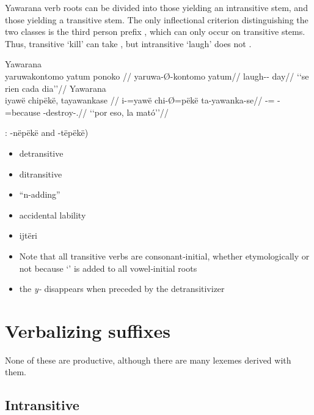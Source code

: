 \documentclass{memoir}
\begin{document}
Yawarana verb roots can be divided into those yielding an intransitive
stem, and those yielding a transitive stem. The only inflectional
criterion distinguishing the two classes is the third person prefix
, which can only occur on transitive stems. Thus, transitive
 `kill' can take  , but
intransitive  `laugh' does not .

\pex\label{}    \a Yawarana\\
    \label{convrisamaj-42}        \begingl
        \glpreamble yaruwakontomo yatum ponoko //
        \gla yaruwa-Ø-kontomo yatum//
        \glb laugh-- day//
            \glft ‘‘se rien cada dia’’//  
        \endgl 
    \a Yawarana\\
    \label{convfemgrme-217}        \begingl
        \glpreamble iyawë chipëkë, tayawankase //
        \gla i-=yawë chi-Ø=pëkë ta-yawanka-se//
        \glb {}-= -=because -destroy-.//
            \glft ‘‘por eso, la mató’’//  
        \endgl 
\xe

: -nëpëkë and -tëpëkë)

\begin{itemize}
\item
  detransitive
\item
  ditransitive
\item
  ``n-adding''
\item
  accidental lability
\item
  ijtëri
\item
  Note that all transitive verbs are consonant‑initial, whether
  etymologically or not because  `' is added to all
  vowel‑initial roots
\item
  the \emph{y‑} disappears when preceded by the detransitivizer
\end{itemize}

\section{\texorpdfstring{Verbalizing suffixes
\label{sec:vbz}}{Verbalizing suffixes }}

None of these are productive, although there are many lexemes derived
with them.

\subsection{Intransitive}
\end{document}
